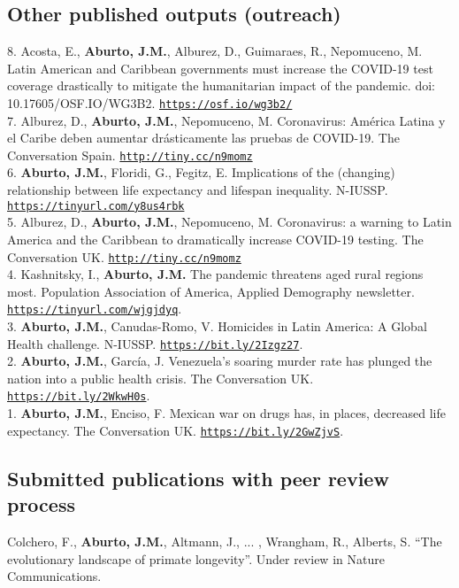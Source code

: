 \documentclass[12pt]{article}
\providecommand*\url[1]{\href{#1}{#1}}
\renewcommand*\url[1]{\href{#1}{\texttt{#1}}}
\begin{document}
\subsection*{Other published outputs (outreach)}	

8. Acosta, E., \textbf{Aburto, J.M.}, Alburez, D., Guimaraes, R., Nepomuceno, M.  Latin American and Caribbean governments must increase the COVID-19 test coverage drastically to mitigate the humanitarian impact of the pandemic. doi: 10.17605/OSF.IO/WG3B2. \url{https://osf.io/wg3b2/}\\

7. Alburez, D., \textbf{Aburto, J.M.}, Nepomuceno, M. Coronavirus: América Latina y el Caribe deben aumentar drásticamente las pruebas de COVID-19. The Conversation Spain. \url{http://tiny.cc/n9momz}\\

6. \textbf{Aburto, J.M.}, Floridi, G., Fegitz, E. Implications of the (changing) relationship between life expectancy and lifespan inequality. N-IUSSP. \url{https://tinyurl.com/y8us4rbk}\\

5. Alburez, D., \textbf{Aburto, J.M.}, Nepomuceno, M. Coronavirus: a warning to Latin America and the Caribbean to dramatically increase COVID-19 testing. The Conversation UK. \url{http://tiny.cc/n9momz}\\

4. Kashnitsky, I., \textbf{Aburto, J.M.} The pandemic threatens aged rural regions most. Population Association of America, Applied Demography newsletter. \url{https://tinyurl.com/wjgjdyq}.\\

3. \textbf{Aburto, J.M.}, Canudas-Romo, V. Homicides in Latin America: A Global Health challenge. N-IUSSP. \url{https://bit.ly/2Izgz27}.\\

2. \textbf{Aburto, J.M.}, Garc\'ia, J. Venezuela's soaring murder rate has plunged the nation into a public health crisis. The Conversation UK.\\ \url{https://bit.ly/2WkwH0s}.\\

1. \textbf{Aburto, J.M.}, Enciso, F. Mexican war on drugs has, in places, decreased life expectancy. The Conversation UK. \url{https://bit.ly/2GwZjvS}.\\

\subsection*{Submitted publications with peer review process}	
Colchero, F., \textbf{Aburto, J.M.}, Altmann, J., ... , Wrangham, R., Alberts, S. ``The evolutionary landscape of primate longevity''. Under review in Nature Communications.\\  
\end{document}
